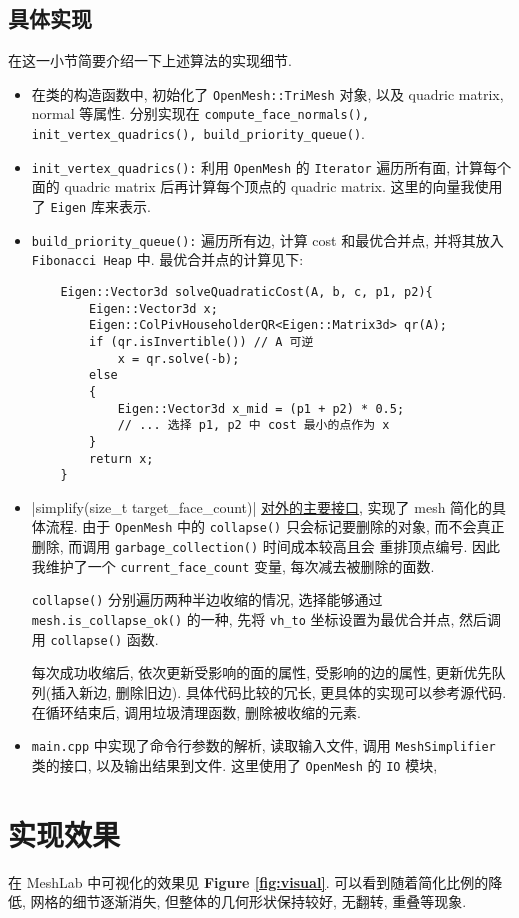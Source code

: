 \documentclass[11pt]{article}
\newcommand\1{\mathds{1}}
\begin{document}
\subsection{具体实现}
在这一小节简要介绍一下上述算法的实现细节. 
\begin{itemize}
    \item 在类的构造函数中, 初始化了 \texttt{OpenMesh::TriMesh} 对象, 以及 quadric matrix, normal 等属性.
    分别实现在 \texttt{compute\_face\_normals(), init\_vertex\_quadrics(), build\_priority\_queue()}.
    \item \texttt{init\_vertex\_quadrics():} 利用 \texttt{OpenMesh} 的 \texttt{Iterator} 遍历所有面, 
    计算每个面的 quadric matrix 后再计算每个顶点的 quadric matrix. 这里的向量我使用了 \texttt{Eigen} 库来表示. 
    \item \texttt{build\_priority\_queue():} 遍历所有边, 计算 cost 和最优合并点, 并将其放入 \texttt{Fibonacci Heap} 中.
    最优合并点的计算见下: 
    \begin{verbatim}
    Eigen::Vector3d solveQuadraticCost(A, b, c, p1, p2){
        Eigen::Vector3d x;
        Eigen::ColPivHouseholderQR<Eigen::Matrix3d> qr(A);
        if (qr.isInvertible()) // A 可逆
            x = qr.solve(-b);
        else
        {
            Eigen::Vector3d x_mid = (p1 + p2) * 0.5;
            // ... 选择 p1, p2 中 cost 最小的点作为 x
        }
        return x;
    }
    \end{verbatim}
    \item {}|simplify(size_t target_face_count)| 
    \underline{对外的主要接口}, 实现了 mesh 简化的具体流程. 由于 \texttt{OpenMesh} 中的 \texttt{collapse()} 
    只会标记要删除的对象, 而不会真正删除, 而调用 \texttt{garbage\_collection()} 时间成本较高且会
    重排顶点编号. 因此我维护了一个 \texttt{current\_face\_count} 变量, 每次减去被删除的面数.

    \texttt{collapse()} 分别遍历两种半边收缩的情况, 选择能够通过 \texttt{mesh.is\_collapse\_ok()} 
    的一种, 先将 \texttt{vh\_to} 坐标设置为最优合并点, 然后调用 \texttt{collapse()} 函数. 

    每次成功收缩后, 依次更新受影响的面的属性, 受影响的边的属性, 更新优先队列(插入新边, 删除旧边).
    具体代码比较的冗长, 更具体的实现可以参考源代码. 在循环结束后, 调用垃圾清理函数, 
    删除被收缩的元素.

    \item \texttt{main.cpp} 中实现了命令行参数的解析, 读取输入文件, 调用 \texttt{MeshSimplifier} 类的接口,
    以及输出结果到文件. 这里使用了 \texttt{OpenMesh} 的 \texttt{IO} 模块,
\end{itemize}
\section{实现效果}
在 MeshLab 中可视化的效果见 \textbf{Figure \ref{fig:visual}}. 可以看到随着简化比例的降低,
网格的细节逐渐消失, 但整体的几何形状保持较好, 无翻转, 重叠等现象.


 
 
\end{document}
